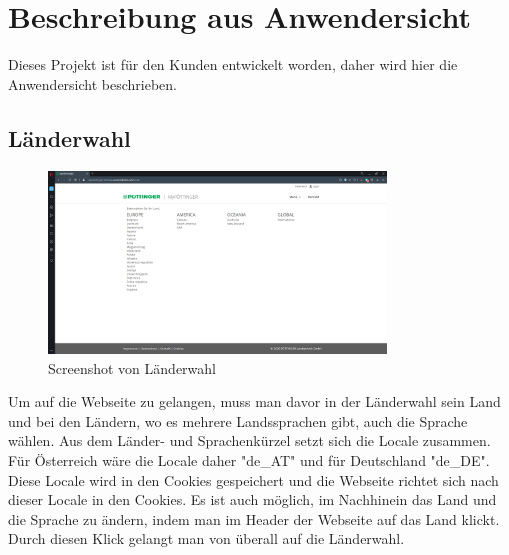 \chapter{Beschreibung aus Anwendersicht} \label{anwendersicht}
Dieses Projekt ist für den Kunden entwickelt worden, daher wird hier die Anwendersicht beschrieben.
\section{Länderwahl}
\begin{figure}[h]
	\centerline{
		\includegraphics[width=0.8\textwidth]{./grafiken/erm_country_selection.png}
	}
	\vskip0pt
	\caption{Screenshot von Länderwahl} \label{fig:countrySelection}
\end{figure}
Um auf die Webseite zu gelangen, muss man davor in der Länderwahl sein Land und bei den Ländern, wo es mehrere Landssprachen gibt, auch die Sprache wählen. Aus dem Länder- und Sprachenkürzel setzt sich die Locale zusammen. Für Österreich wäre die Locale daher "de\_AT" und für Deutschland "de\_DE". Diese Locale wird in den Cookies gespeichert und die Webseite richtet sich nach dieser Locale in den Cookies. Es ist auch möglich, im Nachhinein das Land und die Sprache zu ändern, indem man im Header der Webseite auf das Land klickt. Durch diesen Klick gelangt man von überall auf die Länderwahl.

